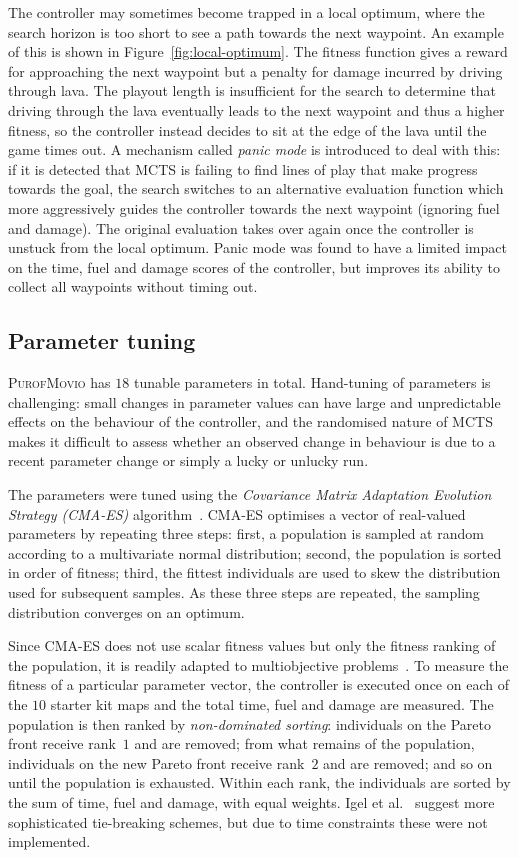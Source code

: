 \documentclass[conference]{IEEEtran}
\begin{document}
The controller may sometimes become trapped in a local optimum,
where the search horizon is too short to see a path towards the next waypoint.
An example of this is shown in Figure~\ref{fig:local-optimum}.
The fitness function gives a reward for approaching the next waypoint but a penalty for damage incurred by driving through lava.
The playout length is insufficient for the search to determine that driving through the lava eventually leads to the next waypoint and thus a higher fitness,
so the controller instead decides to sit at the edge of the lava until the game times out.
A mechanism called \emph{panic mode} is introduced to deal with this:
if it is detected that MCTS is failing to find lines of play that make progress towards the goal,
the search switches to an alternative evaluation function which more aggressively guides the controller towards the next waypoint (ignoring fuel and damage).
The original evaluation takes over again once the controller is unstuck from the local optimum.
Panic mode was found to have a limited impact on the time, fuel and damage scores of the controller,
but improves its ability to collect all waypoints without timing out.

\subsection{Parameter tuning}

\textsc{PurofMovio} has $18$ tunable parameters in total.
Hand-tuning of parameters is challenging:
small changes in parameter values can have large and unpredictable effects on the behaviour of the controller,
and the randomised nature of MCTS makes it difficult to assess whether an observed change in behaviour is due to a recent parameter change
or simply a lucky or unlucky run.

The parameters were tuned using the \emph{Covariance Matrix Adaptation Evolution Strategy (CMA-ES)} algorithm~\cite{Hansen2001}.
CMA-ES optimises a vector of real-valued parameters by repeating three steps:
first, a population is sampled at random according to a multivariate normal distribution;
second, the population is sorted in order of fitness;
third, the fittest individuals are used to skew the distribution used for subsequent samples.
As these three steps are repeated, the sampling distribution converges on an optimum.

Since CMA-ES does not use scalar fitness values but only the fitness ranking of the population,
it is readily adapted to multiobjective problems~\cite{Igel2007}.
To measure the fitness of a particular parameter vector,
the controller is executed once on each of the $10$ starter kit maps and the total time, fuel and damage are measured.
The population is then ranked by \emph{non-dominated sorting}:
individuals on the Pareto front receive rank~$1$ and are removed;
from what remains of the population, individuals on the new Pareto front receive rank~$2$ and are removed;
and so on until the population is exhausted.
Within each rank, the individuals are sorted by the sum of time, fuel and damage, with equal weights.
Igel et al.~\cite{Igel2007} suggest more sophisticated tie-breaking schemes, but due to time constraints these were not implemented.
\end{document}
